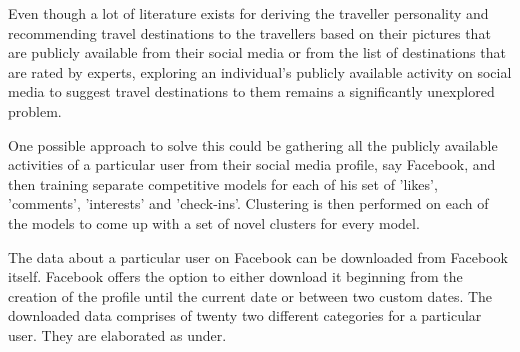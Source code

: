 Even though a lot of literature exists for deriving the traveller personality and recommending travel destinations to the travellers based on their pictures that are publicly available from their social media or from the list of destinations that are rated by experts, exploring an individual's publicly available activity on social media to suggest travel destinations to them remains a significantly unexplored problem.

One possible approach to solve this could be gathering all the publicly available activities of a particular user from their social media profile, say Facebook, and then training separate competitive models for each of his set of 'likes', 'comments', 'interests' and 'check-ins'. Clustering is then performed on each of the models to come up with a set of novel clusters for every model. 

The data about a particular user on Facebook can be downloaded from Facebook itself. Facebook offers the option to either download it beginning from the creation of the profile until the current date or between two custom dates.
The downloaded data comprises of twenty two different categories for a particular user. They are elaborated as under. 

